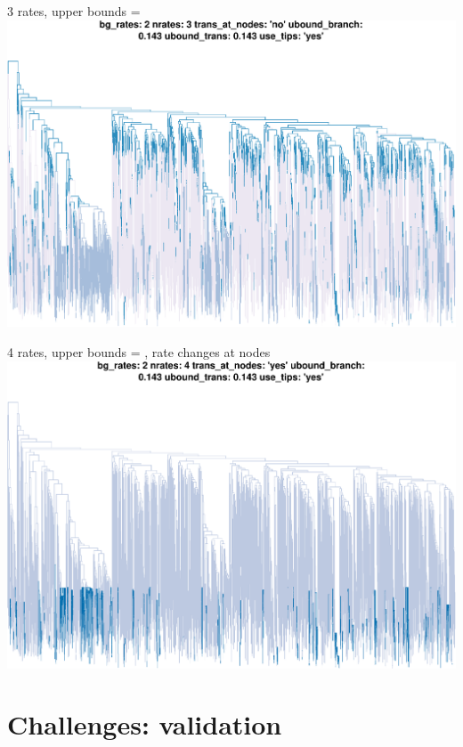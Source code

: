\documentclass{beamer}
\begin{document}
\begin{frame}{3 rates, upper bounds = }
    \includegraphics[width=\textwidth, trim=0 0 0 0.8in, clip=true]{pcbr1}
\end{frame}

\begin{frame}{4 rates, upper bounds = , rate changes at nodes}
    \includegraphics[width=\textwidth, trim=0 0 0 0.8in, clip=true]{pcbr2}
\end{frame}

\section{Challenges: validation}
\end{document}

